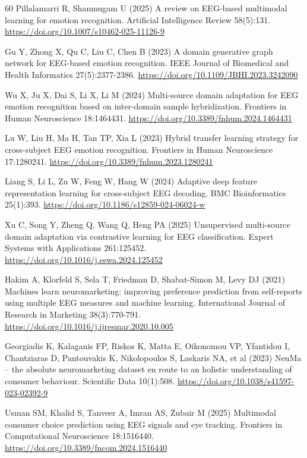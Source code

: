 \begin{thebibliography}{60}
 Pillalamarri R, Shanmugam U (2025) A review on EEG-based multimodal learning for emotion recognition. Artificial Intelligence Review 58(5):131. \url{https://doi.org/10.1007/s10462-025-11126-9}

 Gu Y, Zhong X, Qu C, Liu C, Chen B (2023) A domain generative graph network for EEG-based emotion recognition. IEEE Journal of Biomedical and Health Informatics 27(5):2377-2386. \url{https://doi.org/10.1109/JBHI.2023.3242090}

 Wu X, Ju X, Dai S, Li X, Li M (2024) Multi-source domain adaptation for EEG emotion recognition based on inter-domain sample hybridization. Frontiers in Human Neuroscience 18:1464431. \url{https://doi.org/10.3389/fnhum.2024.1464431}

 Lu W, Liu H, Ma H, Tan TP, Xia L (2023) Hybrid transfer learning strategy for cross-subject EEG emotion recognition. Frontiers in Human Neuroscience 17:1280241. \url{https://doi.org/10.3389/fnhum.2023.1280241}

 Liang S, Li L, Zu W, Feng W, Hang W (2024) Adaptive deep feature representation learning for cross-subject EEG decoding. BMC Bioinformatics 25(1):393. \url{https://doi.org/10.1186/s12859-024-06024-w}

 Xu C, Song Y, Zheng Q, Wang Q, Heng PA (2025) Unsupervised multi-source domain adaptation via contrastive learning for EEG classification. Expert Systems with Applications 261:125452. \url{https://doi.org/10.1016/j.eswa.2024.125452}

 Hakim A, Klorfeld S, Sela T, Friedman D, Shabat-Simon M, Levy DJ (2021) Machines learn neuromarketing: improving preference prediction from self-reports using multiple EEG measures and machine learning. International Journal of Research in Marketing 38(3):770-791. \url{https://doi.org/10.1016/j.ijresmar.2020.10.005}

 Georgiadis K, Kalaganis FP, Riskos K, Matta E, Oikonomou VP, Yfantidou I, Chantziaras D, Pantouvakis K, Nikolopoulos S, Laskaris NA, et al (2023) NeuMa -- the absolute neuromarketing dataset en route to an holistic understanding of consumer behaviour. Scientific Data 10(1):508. \url{https://doi.org/10.1038/s41597-023-02392-9}

 Usman SM, Khalid S, Tanveer A, Imran AS, Zubair M (2025) Multimodal consumer choice prediction using EEG signals and eye tracking. Frontiers in Computational Neuroscience 18:1516440. \url{https://doi.org/10.3389/fncom.2024.1516440}


\end{thebibliography}
